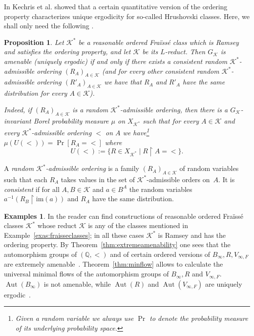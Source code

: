 \documentclass[12pt]{amsart}
\theoremstyle{plain}
\newtheorem{proposition}[theorem]{Proposition}
\theoremstyle{definition}
\newtheorem{examples}[theorem]{Examples}
\begin{document}
In \cite {akl} Kechris et al. showed that a certain quantitative version of the ordering property characterizes unique ergodicity 
for so-called Hrushovski classes. Here, we shall only need the following \cite[P9.2]{akl}.

\begin{proposition} \label{prop:randomorder} Let ${\mathcal K}^*$ be a reasonable ordered Fra\"iss\'e 
class which is Ramsey and satisfies the ordering property, and let ${\mathcal K}$ be its $L$-reduct. 
Then $G_{\mathcal K}$ is amenable (uniquely ergodic)
if and only if there exists a
consistent random ${\mathcal K}^*$-admissible ordering $(R_A)_{A\in{\mathcal K}}$ (and for every other consistent 
random ${\mathcal K}^*$-admissible ordering $(R'_A)_{A\in{\mathcal K}}$ we 
have that $R_A$ and $R'_A$ have the same distribution for every $A\in{\mathcal K}$). 

Indeed, if  $(R_A)_{A\in{\mathcal K}}$ is a random ${\mathcal K}^*$-admissible ordering, then
there is a $G_{\mathcal K}$-invariant Borel probability measure $\mu$ on $X_{{\mathcal K}^*}$ 
such that for every $A\in{\mathcal K}$ and every 
${\mathcal K}^*$-admissible ordering $<$ on $A$ we have\footnote{Given a random variable we always use $\Pr$ to 
denote the probability measure of its underlying probability space.} 
$\mu(U(<))=\Pr[R_A=<]$ where $$U(<):=\{R\in X_{{\mathcal K}^*}\mid R\upharpoonright A=<\}.
$$
\end{proposition}

A {\em random ${\mathcal K}^*$-admissible ordering} is a family $(R_A)_{A\in{\mathcal K}}$ of random variables 
such that each $R_A$ takes values in the set of ${\mathcal K}^*$-admissible 
orders on~$A$. It is {\em consistent} if 
for all $A,B\in{\mathcal K}$ and $a\in B^A$ the random variables $a^{-1}(R_B\upharpoonright {\mathrm{im}}(a))$ and $R_A$ have the same distribution.

\begin{examples}\label{exas} In \cite[$\S6$]{kpt} the reader can find constructions of reasonable 
ordered Fra\"iss\'e classes ${\mathcal K}^*$ whose reduct ${\mathcal K}$ is any of the classes mentioned in Example~\ref{exas:fraisseclasses}; 
in all these cases ${\mathcal K}^*$ is Ramsey and has the ordering property. By Theorem~\ref{thm:extremeamenability} one sees
that the automorphism groups of $(\mathbb Q, <)$ and of certain ordered versions of $B_\infty,R,V_{\infty,F}$ are 
extremely amenable~\cite{kpt}. Theorem~\ref{thm:minflow} allows  to calculate the universal minimal flows of the automorphism 
groups of $B_\infty,R$ and $V_{\infty,F}$. $\operatorname{Aut}(B_\infty)$ is not amenable, while $\operatorname{Aut}(R)$ and $\operatorname{Aut}(V_{\infty,F})$ are uniquely ergodic~\cite{akl}.
\end{examples}
\end{document}
